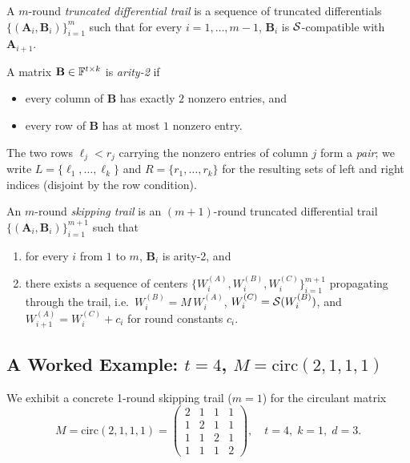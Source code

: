 \documentclass[11pt]{article}
\begin{document}
\begin{definition}
    A $m$-round \emph{truncated differential trail} is a sequence of truncated differentials
    $\{(\mathbf{A}_i,\mathbf{B}_i)\}_{i=1}^{m}$ such that for every $i=1,\ldots,m-1$,
    $\mathbf{B}_i$ is $\mathcal{S}$-compatible with~$\mathbf{A}_{i+1}$.
\end{definition}

\begin{definition}\label{def:arity2}
    A matrix $\mathbf{B}\in\mathbb{F}^{t\times k}$ is \emph{arity-2} if
    \begin{itemize}
        \item every column of $\mathbf{B}$ has exactly $2$ nonzero entries, and
        \item every row of $\mathbf{B}$ has at most $1$ nonzero entry.
    \end{itemize}
    The two rows $\ell_j < r_j$ carrying the nonzero entries of column $j$ form a \emph{pair}; we write $L = \{\ell_1,\ldots,\ell_k\}$ and $R = \{r_1,\ldots,r_k\}$ for the resulting sets of left and right indices (disjoint by the row condition).
\end{definition}

\begin{definition}\label{def:skipping-trail}
    An $m$-round \emph{skipping trail} is an $(m+1)$-round truncated differential
    trail $\{(\mathbf{A}_i,\mathbf{B}_i)\}_{i=1}^{m+1}$ such that
    \begin{enumerate}
        \item for every $i$ from $1$ to $m$, $\mathbf{B}_i$ is arity-2, and
        \item there exists a sequence of centers
        $\{W_i^{(A)}, W_i^{(B)}, W_i^{(C)}\}_{i=1}^{m+1}$ propagating through the trail,
        i.e.\ $W_i^{(B)} = M\,W_i^{(A)}$, $W_i^{(C)} = \mathcal{S}(W_i^{(B)})$, and
        $W_{i+1}^{(A)} = W_i^{(C)} + c_i$ for round constants $c_i$.
    \end{enumerate}
\end{definition}
\subsection{A Worked Example: $t=4$, $M=\mathrm{circ}(2,1,1,1)$}
\label{sec:example}

We exhibit a concrete 1-round skipping trail ($m=1$) for the circulant matrix
\[
    M = \mathrm{circ}(2,1,1,1) =
    \begin{pmatrix}2&1&1&1\\1&2&1&1\\1&1&2&1\\1&1&1&2\end{pmatrix}, \quad t=4,\;k=1,\;d=3.
\]
\end{document}
